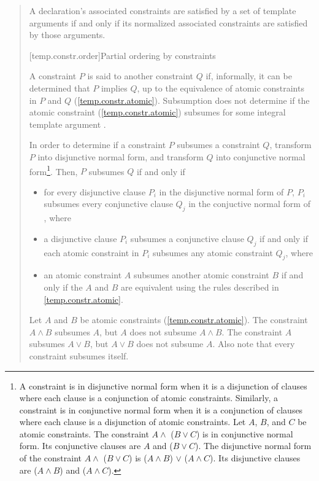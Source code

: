 \begin{quote}
\begin{addedblock}
\pnum
A declaration's associated constraints are satisfied by a set of template
arguments if and only if its normalized associated constraints are satisfied
by those arguments.


[temp.constr.order]{Partial ordering by constraints}

\pnum
A constraint $P$ is said to  another constraint $Q$ 
if, informally, it can be determined that $P$ implies $Q$, up to 
the equivalence of atomic constraints in $P$ and $Q$
(\ref{temp.constr.atomic}).
% 
\enterexample
Subsumption does not determine if the atomic constraint 
 (\ref{temp.constr.atomic}) subsumes  for some 
integral template argument .
\exitexample

\pnum
In order to determine if a constraint $P$ subsumes a constraint
$Q$, transform $P$ into disjunctive normal form, 
and transform $Q$ into conjunctive normal form\footnote{
A constraint is in disjunctive normal form when it is a disjunction of
clauses where each clause is a conjunction of atomic constraints. 
% 
Similarly, a constraint is in conjunctive normal form when it is a conjunction 
of clauses where each clause is a disjunction of atomic constraints.
% 
\enterexample
Let $A$, $B$, and $C$ be atomic constraints.
% 
The constraint $A \land$ ($B \lor C$) is in 
conjunctive normal form.
% 
Its conjunctive clauses are $A$ and ($B \lor C$).
% 
The disjunctive normal form of the constraint
$A \land$ ($B \lor C$) 
is
($A \land B$) $\lor$ ($A \land C$).
% 
Its disjunctive clauses are ($A \land B$) and 
($A \land C$).
\exitexample
}.
% 
Then, $P$ subsumes $Q$ if and only if
\begin{itemize}
\item for every disjunctive clause $P_i$ in the disjunctive normal 
form of $P$, $P_i$ subsumes every conjunctive clause $Q_j$ 
in the conjuctive normal form of , where

\item a disjunctive clause $P_i$ subsumes a conjunctive clause
$Q_j$ if and only if each atomic constraint in $P_i$ subsumes 
any atomic constraint $Q_j$, where

\item an atomic constraint $A$ subsumes another atomic constraint
$B$ if and only if the $A$ and $B$ are equivalent using the
rules described in \ref{temp.constr.atomic}.
\end{itemize}
% 
\enterexample
Let $A$ and $B$ be atomic constraints (\ref{temp.constr.atomic}).
% 
The constraint $A \land B$ subsumes $A$, but $A$ does not subsume $A \land B$.
% 
The constraint $A$ subsumes $A \lor B$, but $A \lor B$ does not subsume $A$.
% 
Also note that every constraint subsumes itself.
\exitexample



\end{addedblock}
\end{quote}
